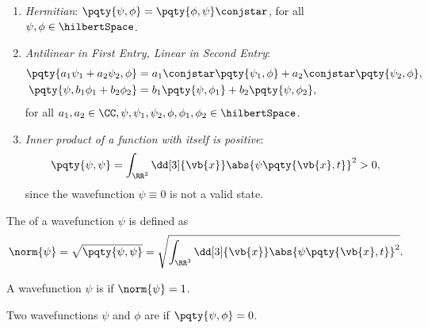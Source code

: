 \begin{proposition}
    \begin{enumerate}
        \item \emph{Hermitian}: \(\pqty{\psi, \phi} = \pqty{\phi, \psi}\conjstar\), for all \(\psi, \phi \in \hilbertSpace\).
        \item \emph{Antilinear in First Entry, Linear in Second Entry}:
        \begin{subequations}
            \begin{align}
                \pqty{a_1 \psi_1 + a_2 \psi_2, \phi} &= a_1\conjstar \pqty{\psi_1, \phi} + a_2\conjstar \pqty{\psi_2, \phi}, \\
                \pqty{\psi, b_1 \phi_1 + b_2 \phi_2} &= b_1 \pqty{\psi, \phi_1} + b_2 \pqty{\psi, \phi_2},
            \end{align}
        \end{subequations}
        for all \(a_1, a_2 \in \CC, \psi, \psi_1, \psi_2, \phi, \phi_1, \phi_2 \in \hilbertSpace\).
        \item \emph{Inner product of a function with itself is positive}:
        \begin{equation}
            \pqty{\psi, \psi} = \int_{\RR^3} \dd[3]{\vb{x}} \abs{\psi\pqty{\vb{x}, t}}^2 > 0,
        \end{equation}
        since the wavefunction \(\psi \equiv 0\) is not a valid state.
    \end{enumerate}
\end{proposition}

\begin{definition}
    The  of a wavefunction \(\psi\) is defined as
    \begin{equation}
        \norm{\psi} = \sqrt{\pqty{\psi, \psi}} = \sqrt{\int_{\RR^3} \dd[3]{\vb{x}} \abs{\psi\pqty{\vb{x}, t}}^2}.
    \end{equation}
\end{definition}

\begin{definition}
    A wavefunction \(\psi\) is  if \(\norm{\psi} = 1\).
\end{definition}

\begin{definition}
    Two wavefunctions \(\psi\) and \(\phi\) are  if \(\pqty{\psi, \phi} = 0\).
\end{definition}

